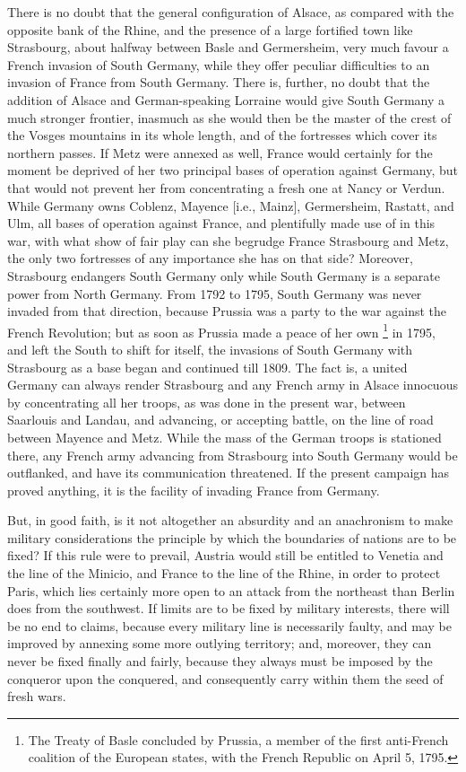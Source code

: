 \documentclass{book}
\begin{document}
There is no doubt that the general configuration of Alsace, as compared
with the opposite bank of the Rhine, and the presence of a large fortified
town like Strasbourg, about halfway between Basle and Germersheim, very
much favour a French invasion of South Germany, while they offer peculiar
difficulties to an invasion of France from South Germany. There is,
further, no doubt that the addition of Alsace and German-speaking Lorraine
would give South Germany a much stronger frontier, inasmuch as she would
then be the master of the crest of the Vosges mountains in its whole
length, and of the fortresses which cover its northern passes. If Metz
were annexed as well, France would certainly for the moment be deprived of
her two principal bases of operation against Germany, but that would not
prevent her from concentrating a fresh one at Nancy or Verdun. While
Germany owns Coblenz, Mayence [i.e., Mainz], Germersheim, Rastatt, and
Ulm, all bases of operation against France, and plentifully made use of in
this war, with what show of fair play can she begrudge France Strasbourg
and Metz, the only two fortresses of any importance she has on that side?
Moreover, Strasbourg endangers South Germany only while South Germany is
a separate power from North Germany. From 1792 to 1795, South Germany was
never invaded from that direction, because Prussia was a party to the war
against the French Revolution; but as soon as Prussia made a peace of her
own \footnote{The Treaty of Basle concluded by Prussia, a member of the
first anti-French coalition of the European states, with the French
Republic on April 5, 1795.} in 1795, and left the South to shift for
itself, the invasions of South Germany with Strasbourg as a base began and
continued till 1809. The fact is, a united Germany can always render
Strasbourg and any French army in Alsace innocuous by concentrating all
her troops, as was done in the present war, between Saarlouis and Landau,
and advancing, or accepting battle, on the line of road between Mayence
and Metz. While the mass of the German troops is stationed there, any
French army advancing from Strasbourg into South Germany would be
outflanked, and have its communication threatened. If the present campaign
has proved anything, it is the facility of invading France from Germany.

But, in good faith, is it not altogether an absurdity and an anachronism
to make military considerations the principle by which the boundaries of
nations are to be fixed? If this rule were to prevail, Austria would still
be entitled to Venetia and the line of the Minicio, and France to the line
of the Rhine, in order to protect Paris, which lies certainly more open to
an attack from the northeast than Berlin does from the southwest. If
limits are to be fixed by military interests, there will be no end to
claims, because every military line is necessarily faulty, and may be
improved by annexing some more outlying territory; and, moreover, they can
never be fixed finally and fairly, because they always must be imposed by
the conqueror upon the conquered, and consequently carry within them the
seed of fresh wars.
\end{document}
